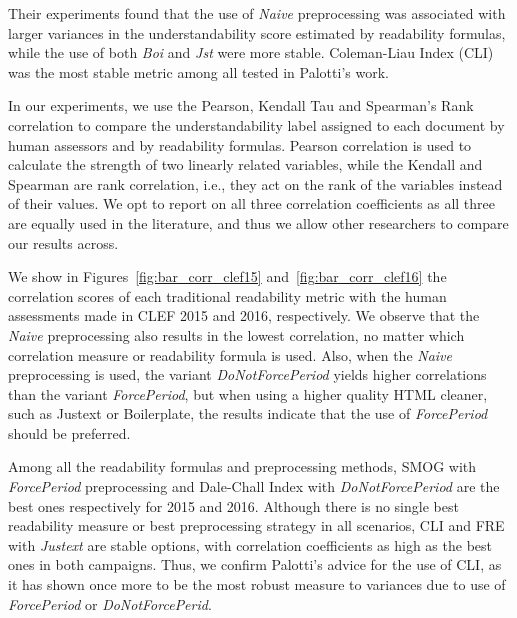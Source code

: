 \documentclass[runningheads,a4paper]{llncs}
\begin{document}
Their experiments found that the use of \textit{Naive} preprocessing was associated with larger variances in the understandability score estimated by readability formulas, while the use of both \textit{Boi} and \textit{Jst} were more stable. Coleman-Liau Index (CLI) was the most stable metric among all tested in Palotti's work\cite{palotti15}.

In our experiments, we use the Pearson, Kendall Tau and Spearman's Rank correlation to compare the understandability label assigned to each document by human assessors and by readability formulas.
Pearson correlation is used to calculate the strength of two linearly related variables, while the Kendall and Spearman are rank correlation, i.e., they act on the rank of the variables instead of their values. We opt to report on all three correlation coefficients as all three are equally used in the literature, and thus we allow other researchers to compare our results across.

We show in Figures~\ref{fig:bar_corr_clef15} and~\ref{fig:bar_corr_clef16} the correlation scores of each traditional readability metric with the human assessments made in CLEF 2015 and 2016, respectively. We observe that the \textit{Naive} preprocessing also results in the lowest
correlation, no matter which correlation measure or readability formula is used. Also, when the \textit{Naive} preprocessing is used, the variant \textit{DoNotForcePeriod} yields higher correlations than the variant \textit{ForcePeriod}, but when using a higher quality HTML cleaner, such as Justext or Boilerplate, the results indicate that the use of \textit{ForcePeriod} should be preferred.

Among all the readability formulas and preprocessing methods, SMOG with \textit{ForcePeriod} preprocessing and Dale-Chall Index with \textit{DoNotForcePeriod} are the best ones respectively for 2015 and 2016. Although there is no single best readability measure or best preprocessing strategy in all scenarios, CLI and FRE with \textit{Justext} are stable options, with correlation coefficients as high as the best ones in both campaigns. Thus, we confirm Palotti's advice for the use of CLI, as it
has shown once more to be the most robust measure to variances due to use of \textit{ForcePeriod} or \textit{DoNotForcePerid}.
\end{document}
